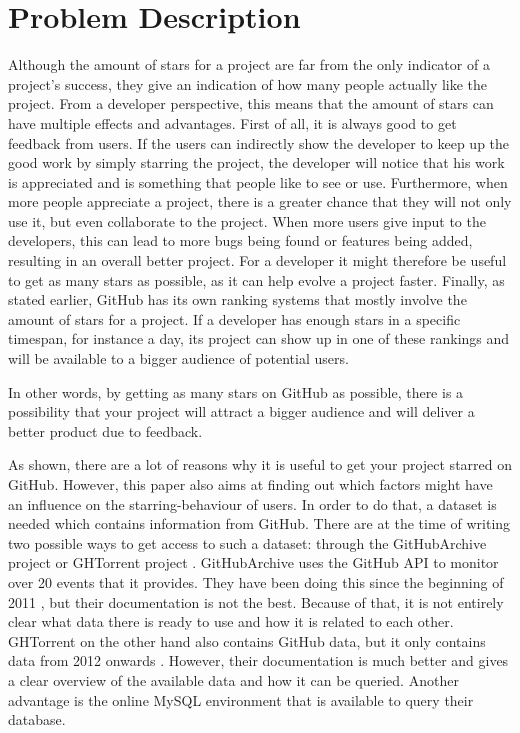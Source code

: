 \section{Problem Description}
    Although the amount of stars for a project are far from the only indicator of a project's success, they give an indication of how many people actually like the project.
    From a developer perspective, this means that the amount of stars can have multiple effects and advantages.
    First of all, it is always good to get feedback from users.
    If the users can indirectly show the developer to keep up the good work by simply starring the project, the developer will notice that his work is appreciated and is something that people like to see or use.
    Furthermore, when more people appreciate a project, there is a greater chance that they will not only use it, but even collaborate to the project.
    When more users give input to the developers, this can lead to more bugs being found or features being added, resulting in an overall better project.
    For a developer it might therefore be useful to get as many stars as possible, as it can help evolve a project faster.
    Finally, as stated earlier, GitHub has its own ranking systems that mostly involve the amount of stars for a project.
    If a developer has enough stars in a specific timespan, for instance a day, its project can show up in one of these rankings and will be available to a bigger audience of potential users.

    In other words, by getting as many stars on GitHub as possible, there is a possibility that your project will attract a bigger audience and will deliver a better product due to feedback.



    As shown, there are a lot of reasons why it is useful to get your project starred on GitHub.
    However, this paper also aims at finding out which factors might have an influence on the starring-behaviour of users.
    In order to do that, a dataset is needed which contains information from GitHub.
    There are at the time of writing two possible ways to get access to such a dataset: through the GitHubArchive project \cite{TODO} or GHTorrent project \cite{TODO}.
    GitHubArchive uses the GitHub API to monitor over 20 events \cite{TODO} that it provides. 
    They have been doing this since the beginning of 2011 \cite{TODO}, but their documentation is not the best.
    Because of that, it is not entirely clear what data there is ready to use and how it is related to each other.
    GHTorrent on the other hand also contains GitHub data, but it only contains data from 2012 onwards \cite{TODO}.
    However, their documentation is much better and gives a clear overview of the available data and how it can be queried.
    Another advantage is the online MySQL environment \cite{TODO} that is available to query their database.


